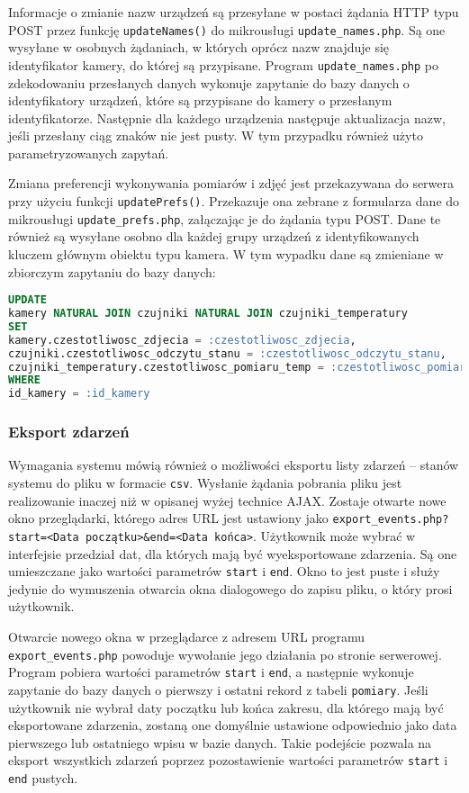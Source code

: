 \documentclass[a4paper,11pt,twoside]{article}
\begin{document}
Informacje o zmianie nazw urządzeń są przesyłane w postaci żądania HTTP typu POST przez funkcję \texttt{updateNames()} do mikrousługi \texttt{update{\_}names.php}. Są one wysyłane w osobnych żądaniach, w których oprócz nazw znajduje się identyfikator kamery, do której są przypisane. Program \texttt{update{\_}names.php} po zdekodowaniu przesłanych danych wykonuje zapytanie do bazy danych o identyfikatory urządzeń, które są przypisane do kamery o przesłanym identyfikatorze. Następnie dla każdego urządzenia następuje aktualizacja nazw, jeśli przesłany ciąg znaków nie jest pusty. W tym przypadku również użyto parametryzowanych zapytań.

Zmiana preferencji wykonywania pomiarów i zdjęć jest przekazywana do serwera przy użyciu funkcji \texttt{updatePrefs()}. Przekazuje ona zebrane z formularza dane do mikrousługi \texttt{update{\_}prefs.php}, załączając je do żądania typu POST. Dane te również są wysyłane osobno dla każdej grupy urządzeń z identyfikowanych kluczem głównym obiektu typu kamera. W tym wypadku dane są zmieniane w zbiorczym zapytaniu do bazy danych:
\begin{lstlisting}[language=SQL]
UPDATE 
kamery NATURAL JOIN czujniki NATURAL JOIN czujniki_temperatury 
SET 
kamery.czestotliwosc_zdjecia = :czestotliwosc_zdjecia, 
czujniki.czestotliwosc_odczytu_stanu = :czestotliwosc_odczytu_stanu,
czujniki_temperatury.czestotliwosc_pomiaru_temp = :czestotliwosc_pomiaru_temp
WHERE 
id_kamery = :id_kamery
\end{lstlisting}

\subsubsection{Eksport zdarzeń}
Wymagania systemu mówią również o możliwości eksportu listy zdarzeń -- stanów systemu do pliku w formacie \texttt{csv}. Wysłanie żądania pobrania pliku jest realizowanie inaczej niż w opisanej wyżej technice AJAX. Zostaje otwarte nowe okno przeglądarki, którego adres URL jest ustawiony jako \texttt{export{\_}events.php?start=<Data początku>{\&}end=<Data końca>}. Użytkownik może wybrać w interfejsie przedział dat, dla których mają być wyeksportowane zdarzenia. Są one umieszczane jako wartości parametrów \texttt{start} i \texttt{end}. Okno to jest puste i służy jedynie do wymuszenia otwarcia okna dialogowego do zapisu pliku, o który prosi użytkownik.

Otwarcie nowego okna w przeglądarce z adresem URL programu \texttt{export{\_}events.php} powoduje wywołanie jego działania po stronie serwerowej. Program pobiera wartości parametrów \texttt{start} i \texttt{end}, a następnie wykonuje zapytanie do bazy danych o pierwszy i ostatni rekord z tabeli \texttt{pomiary}. Jeśli użytkownik nie wybrał daty początku lub końca zakresu, dla którego mają być eksportowane zdarzenia, zostaną one domyślnie ustawione odpowiednio jako data pierwszego lub ostatniego wpisu w bazie danych. Takie podejście pozwala na eksport wszystkich zdarzeń poprzez pozostawienie wartości parametrów \texttt{start} i \texttt{end} pustych.
\end{document}
